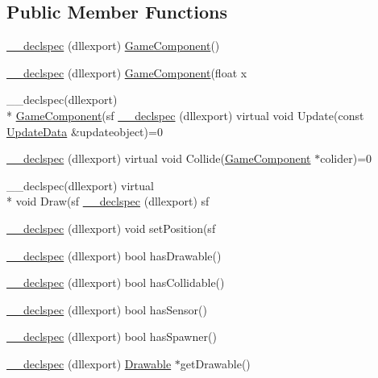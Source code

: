 \subsection*{Public Member Functions}
\begin{DoxyCompactItemize}
\item 
\hyperlink{class_game_component_aec6902a27ee66f4b1412c102277be8f9}{\-\_\-\-\_\-declspec} (dllexport) \hyperlink{class_game_component}{Game\-Component}()
\item 
\hyperlink{class_game_component_a2249fc751888d23760697125a6964188}{\-\_\-\-\_\-declspec} (dllexport) \hyperlink{class_game_component}{Game\-Component}(float x
\item 
\-\_\-\-\_\-declspec(dllexport) \\*
\hyperlink{class_game_component}{Game\-Component}(sf \hyperlink{class_game_component_af064c62d1379d3c3a735f394ad0c0ee9}{\-\_\-\-\_\-declspec} (dllexport) virtual void Update(const \hyperlink{class_update_data}{Update\-Data} \&updateobject)=0
\item 
\hyperlink{class_game_component_a0b877f1873af198a8e62e9ac06d5a02f}{\-\_\-\-\_\-declspec} (dllexport) virtual void Collide(\hyperlink{class_game_component}{Game\-Component} $\ast$colider)=0
\item 
\-\_\-\-\_\-declspec(dllexport) virtual \\*
void Draw(sf \hyperlink{class_game_component_aa90b0af397b0dd5b6bf9841417c7af89}{\-\_\-\-\_\-declspec} (dllexport) sf
\item 
\hyperlink{class_game_component_abe485cab452953b6c1f0acba5a818cf6}{\-\_\-\-\_\-declspec} (dllexport) void set\-Position(sf
\item 
\hyperlink{class_game_component_a2cfb54512fe7510015f8088f7f65695e}{\-\_\-\-\_\-declspec} (dllexport) bool has\-Drawable()
\item 
\hyperlink{class_game_component_a88fa0ae59963cfe37ef8c701070fb6f3}{\-\_\-\-\_\-declspec} (dllexport) bool has\-Collidable()
\item 
\hyperlink{class_game_component_ac9aaef1c89eafbd0c3959a096253a402}{\-\_\-\-\_\-declspec} (dllexport) bool has\-Sensor()
\item 
\hyperlink{class_game_component_a394efd23d349b977eea088fd132e7c9f}{\-\_\-\-\_\-declspec} (dllexport) bool has\-Spawner()
\item 
\hyperlink{class_game_component_a08bc91b41fde1cb87b3e88d8c595222f}{\-\_\-\-\_\-declspec} (dllexport) \hyperlink{class_drawable}{Drawable} $\ast$get\-Drawable()
\item 

\end{DoxyCompactItemize}

